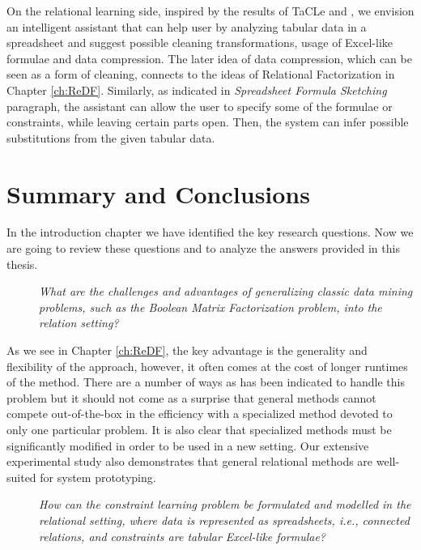 On the relational learning side, inspired by the results of TaCLe
\cite{tacle} and \cite{flashfill}, we envision an intelligent
assistant that can help user by analyzing tabular data in a
spreadsheet and suggest possible cleaning transformations, usage of
Excel-like formulae and data compression. The later idea of data
compression, which can be seen as a form of cleaning, connects to the
ideas of Relational Factorization in Chapter \ref{ch:ReDF}.
Similarly, as indicated in \textit{Spreadsheet Formula Sketching}
paragraph, the assistant can allow the user to specify some of the
formulae or constraints, while leaving certain parts open. Then, the
system can infer possible substitutions from the given tabular data.


\section{Summary and Conclusions}
In the introduction chapter we have identified the key research
questions. Now we are going to review these questions and to analyze the answers provided in this thesis.

\begin{description}
\item[\cone] \textit{What are the challenges and advantages of generalizing
    classic data mining problems, such as the Boolean Matrix
  Factorization problem, into the relation setting?}
\end{description}

As we see in Chapter \ref{ch:ReDF}, the key advantage is the
generality and flexibility of the approach, however, it often comes at
the cost of longer runtimes of the method. There are a number of ways
as has been indicated to handle this problem but it should not come as
a surprise that general methods cannot compete out-of-the-box in the efficiency with
a specialized method devoted to only one particular problem. It is
also clear that specialized methods must be significantly modified in
order to be used in a new setting. Our extensive experimental study
also demonstrates that general relational methods are well-suited for
system prototyping.

\begin{description}
    \item[\ctwo] \textit{How can the constraint learning problem be formulated
   and modelled in the relational setting, where data is
   represented as spreadsheets, i.e., connected relations, and constraints are
   tabular Excel-like formulae?}
\end{description}

